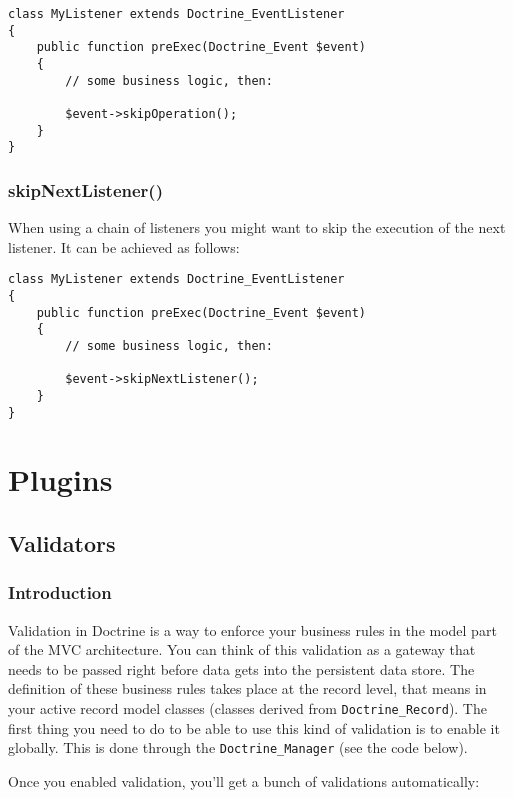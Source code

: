 \documentclass[11pt,a4paper]{report}
\begin{document}
\begin{verbatim}
class MyListener extends Doctrine_EventListener
{
    public function preExec(Doctrine_Event $event)
    {
        // some business logic, then:

        $event->skipOperation();
    }
}
\end{verbatim}

\subsection{skipNextListener()}
When using a chain of listeners you might want to skip the execution of the next listener. It can be achieved as follows:

\begin{verbatim}
class MyListener extends Doctrine_EventListener
{
    public function preExec(Doctrine_Event $event)
    {
        // some business logic, then:

        $event->skipNextListener();
    }
}
\end{verbatim}

\chapter{Plugins}
\section{Validators}
\subsection{Introduction}
Validation in Doctrine is a way to enforce your business rules in the model part of the MVC architecture. You can think of this validation as a gateway that needs to be passed right before data gets into the persistent data store. The definition of these business rules takes place at the record level, that means in your active record model classes (classes derived from \texttt{Doctrine\_Record}). The first thing you need to do to be able to use this kind of validation is to enable it globally. This is done through the \texttt{Doctrine\_Manager} (see the code below).

Once you enabled validation, you'll get a bunch of validations automatically:
\end{document}
